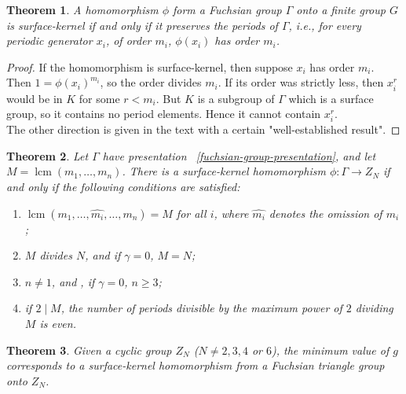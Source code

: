 \documentclass[reqno]{amsart}
\newtheorem{theorem}{Theorem}[section]
\theoremstyle{definition}
\theoremstyle{remark}
\DeclareMathOperator{\lcm}{lcm}
\begin{document}
\begin{theorem}
    A homomorphism 
    $\phi$ form a Fuchsian group $\Gamma$ onto
    a finite group $G$ is surface-kernel if and only if it preserves the periods of $\Gamma$,
    i.e., for every periodic generator
    $x_i$, of order
    $m_i$, $\phi (x_i)$ has
    order $m_i$.
\end{theorem}

\begin{proof}
    If the homomorphism is surface-kernel, then
    suppose $x_i$ has
    order $m_i$. Then
    $1 = \phi(x_i)^{m_i}$,
    so the order divides $m_i$. If its order was
    strictly less, then
    $x_i^r$ would be in $K$
    for some $r < m_i$. But
    $K$ is a subgroup of 
    $\Gamma$ which
    is a surface group, so
    it contains no period
    elements. Hence
    it cannot contain $x_i^r$.\\
    \linebreak
    The other direction is given in the text with a certain "well-established result". 
\end{proof}

\begin{theorem}
    Let $\Gamma$ have presentation ~\ref{fuchsian-group-presentation}, and
    let $M = 
    \lcm (m_1, \ldots, m_n)$.
    There is a surface-kernel
    homomorphism
    $\phi \colon \Gamma
    \to Z_N$ if and only
    if the following conditions are satisfied:
    \begin{enumerate}
        \item 
        $\lcm(m_1, \ldots,
        \hat{m_i}, \ldots
        , m_n) = M$ for
        all $i$, where
        $\hat{m_i}$ denotes
        the omission of $m_i$;
        \item $M$ divides
        $N$, and if
        $\gamma = 0$, 
        $M = N$;
        \item $n\neq 1$, and
        , if $\gamma = 0$,
        $n \geq 3$;
        \item if $2 \mid M$,
        the number of periods divisible by the maximum power of $2$ dividing $M$ is even.
    \end{enumerate}
\end{theorem}


\begin{theorem}
    Given a cyclic group $Z_N$ ($N \neq 2,3,4$ or $6$), the minimum value of $g$ corresponds to a surface-kernel homomorphism from a Fuchsian triangle group onto $Z_N$.
\end{theorem} 
\end{document}
